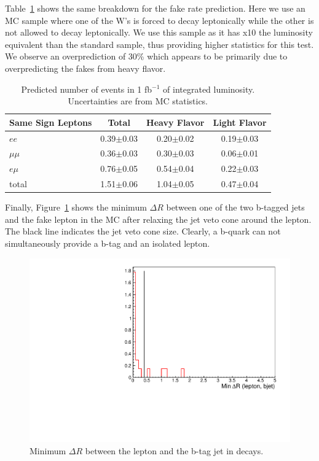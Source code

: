 Table~\ref{tab:fakeOrigin2} shows the same breakdown for the fake rate prediction.
Here we use an MC sample where one of the W's is forced to decay leptonically while the other is not allowed to decay
leptonically.
We use this sample as it has x10 the luminosity equivalent than the standard \ttbar sample, thus providing higher statistics for 
this test. We observe an overprediction of 30\% which appears to be primarily due to overpredicting the fakes from heavy flavor.

\begin{table}[hbt]
\begin{center}
\begin{tabular}{|l|c|c|c|}\hline
Same Sign Leptons & Total &  Heavy Flavor & Light Flavor\\ \hline
$ee$ & 0.39$\pm$0.03 & 0.20$\pm$0.02 & 0.19$\pm$0.03 \\
$\mu\mu$ & 0.36$\pm$0.03 & 0.30$\pm$0.03 & 0.06$\pm$0.01 \\
$e\mu$ & 0.76$\pm$0.05 & 0.54$\pm$0.04 & 0.22$\pm$0.03 \\
total & 1.51$\pm$0.06 & 1.04$\pm$0.05 & 0.47$\pm$0.04  \\ \hline
\end{tabular}
\caption{ Predicted number of \ttbar events in 1 fb$^{-1}$ of integrated luminosity. Uncertainties are from MC statistics.\label{tab:fakeOrigin2}}
\end{center}
\end{table}

Finally, Figure~\ref{fig:ttbar_residual} shows the minimum $\Delta R$ between one of the two b-tagged jets and 
the fake lepton in the MC after 
relaxing the jet veto cone around the lepton. 
The black line indicates the jet veto cone size. Clearly, a b-quark can not simultaneously provide a b-tag and an isolated lepton.

\begin{figure}[htb]
\begin{center}
\includegraphics[width=0.6\linewidth, height=0.4\linewidth]{figs/bjetlepton.pdf}
\caption{ Minimum $\Delta R$ between the lepton and the b-tag jet in \ttbar decays.\label{fig:ttbar_residual}}
\end{center}
\end{figure}




 




